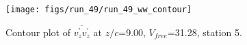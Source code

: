\begin{figure}[H]
\centering
\texttt{[image: figs/run\_49/run\_49\_ww\_contour]}
\caption{Contour plot of $\overline{v_{z}^{\prime} v_{z}^{\prime}}$ at $z/c$=9.00, $V_{free}$=31.28, station 5.}
\label{fig:run_49_ww_contour}
\end{figure}


